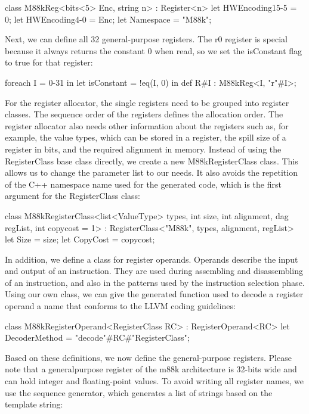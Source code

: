 \begin{cpp}
class M88kReg<bits<5> Enc, string n> : Register<n> {
    let HWEncoding{15-5} = 0;
    let HWEncoding{4-0} = Enc;
    let Namespace = "M88k";
}
\end{cpp}

Next, we can define all 32 general-purpose registers. The r0 register is special because it always returns the constant 0 when read, so we set the isConstant flag to true for that register:

\begin{cpp}
foreach I = 0-31 in {
    let isConstant = !eq(I, 0) in
        def R#I : M88kReg<I, "r"#I>;
}
\end{cpp}

For the register allocator, the single registers need to be grouped into register classes. The sequence order of the registers defines the allocation order. The register allocator also needs other information about the registers such as, for example, the value types, which can be stored in a register, the spill size of a register in bits, and the required alignment in memory. Instead of using the RegisterClass base class directly, we create a new M88kRegisterClass class. This allows us to change the parameter list to our needs. It also avoids the repetition of the C++ namespace name used for the generated code, which is the first argument for the RegisterClass class:

\begin{cpp}
class M88kRegisterClass<list<ValueType> types, int size,
                        int alignment, dag regList,
                        int copycost = 1>
    : RegisterClass<"M88k", types, alignment, regList> {
    let Size = size;
    let CopyCost = copycost;
}
\end{cpp}

In addition, we define a class for register operands. Operands describe the input and output of an instruction. They are used during assembling and disassembling of an instruction, and also in the patterns used by the instruction selection phase. Using our own class, we can give the generated function used to decode a register operand a name that conforms to the LLVM coding guidelines:

\begin{cpp}
class M88kRegisterOperand<RegisterClass RC>
: RegisterOperand<RC> {
    let DecoderMethod = "decode"#RC#"RegisterClass";
}
\end{cpp}

Based on these definitions, we now define the general-purpose registers. Please note that a generalpurpose register of the m88k architecture is 32-bits wide and can hold integer and floating-point values. To avoid writing all register names, we use the sequence generator, which generates a list of strings based on the template string:


